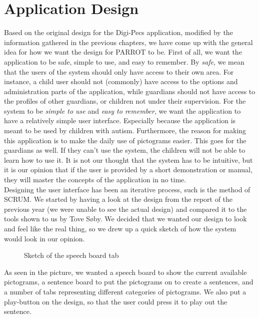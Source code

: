 \chapter{Application Design}
\label{appdes}
Based on the original design for the Digi-Pecs application, modified by the information gathered in the previous chapters, we have come up with the general idea for how we want the design for PARROT to be.\newline
First of all, we want the application to be safe, simple to use, and easy to remember.\newline
By \textit{safe}, we mean that the users of the system should only have access to their own area. For instance, a child user should not (commonly) have access to the options and administration parts of the application, while guardians should not have access to the profiles of other guardians, or children not under their supervision.\newline
For the system to be \textit{simple to use} and \textit{easy to remember}, we want the application to have a relatively simple user interface. Especially because the application is meant to be used by children with autism. Furthermore, the reason for making this application is to make the daily use of pictograms easier. This goes for the guardians as well. If they can't use the system, the children will not be able to learn how to use it.\newline
It is not our thought that the system has to be intuitive, but it is our opinion that if the user is provided by a short demonstration or manual, they will master the concepts of the application in no time.\newline
\\
Designing the user interface has been an iterative process, such is the method of SCRUM. We started by having a look at the design from the report of the previous year (we were unable to see the actual design) and compared it to the tools shown to us by Tove S\o{}by.%
We decided that we wanted our design to look and feel like the real thing, so we drew up a quick sketch of how the system would look in our opinion.\newline
\begin{figure}[htbp]
	\centering
	\caption{Sketch of the speech board tab}
	\label{sketchspeech}
\end{figure}
As seen in the picture, we wanted a speech board to show the current available pictograms, a sentence board to put the pictograms on to create a sentences, and a number of tabs representing different categories of pictograms. We also put a play-button on the design, so that the user could press it to play out the sentence.\newline
